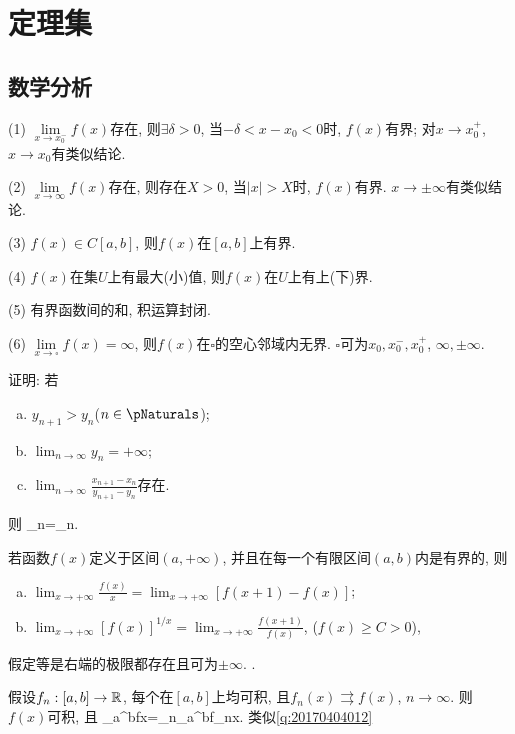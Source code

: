 \chapter{定理集}
\section{数学分析}
(1) $\lim\limits_{x\to x_0^{-}}f(x)$存在, 则$\exists\delta>0$, 当$-\delta<x-x_0<0$时, $f(x)$有界; 对$x\to x_0^+$, $x\to x_0$有类似结论.

(2) $\lim\limits_{x\to\infty}f(x)$存在, 则存在$X>0$, 当$|x|>X$时, $f(x)$有界. $x\to\pm\infty$有类似结论.

(3) $f(x)\in C[a,b]$, 则$f(x)$在$[a,b]$上有界.

(4) $f(x)$在集$U$上有最大(小)值, 则$f(x)$在$U$上有上(下)界.

(5) 有界函数间的和, 积运算封闭.

(6) $\lim\limits_{x\to\square}f(x)=\infty$, 则$f(x)$在$\square$的空心邻域内无界. $\square$可为$x_0, x_0^-, x_0^+$, $\infty, \pm\infty$.
\et

证明: 若
\begin{enumerate}[(a)]
 \item $y_{n+1}>y_n$($n\in\pNaturals$);
 \item $\lim_{n\to\infty}y_n=+\infty$;
 \item $\lim_{n\to\infty}\frac{x_{n+1}-x_n}{y_{n+1}-y_n}$存在.
\end{enumerate}
则
\bee
\lim_{n\to\infty}=\lim_{n\to\infty}.
\eee
\et

若函数$f(x)$定义于区间$(a,+\infty)$, 并且在每一个有限区间$(a,b)$内是有界的, 则
\begin{enumerate}[(a)]
 \item $\lim_{x\to+\infty}\frac{f(x)}{x}=\lim_{x\to+\infty}[f(x+1)-f(x)]$;
 \item $\lim_{x\to+\infty}[f(x)]^{1/x}=\lim_{x\to+\infty}\frac{f(x+1)}{f(x)}$, ($f(x)\ge C>0$),
\end{enumerate}
假定等是右端的极限都存在且可为$\pm\infty$.
\et
{}.

假设$f_n: [a,b]\to\Bbb R$, 每个在$[a,b]$上均可积, 且$f_n(x)\rightrightarrows f(x)$, $n\to\infty$.
则$f(x)$可积, 且
\bee
\int_a^bf\ud x=\lim_{n\to\infty}\int_a^bf_n\ud x.
\eee
\et
\ba
类似\ref{q:20170404012}
\ea


